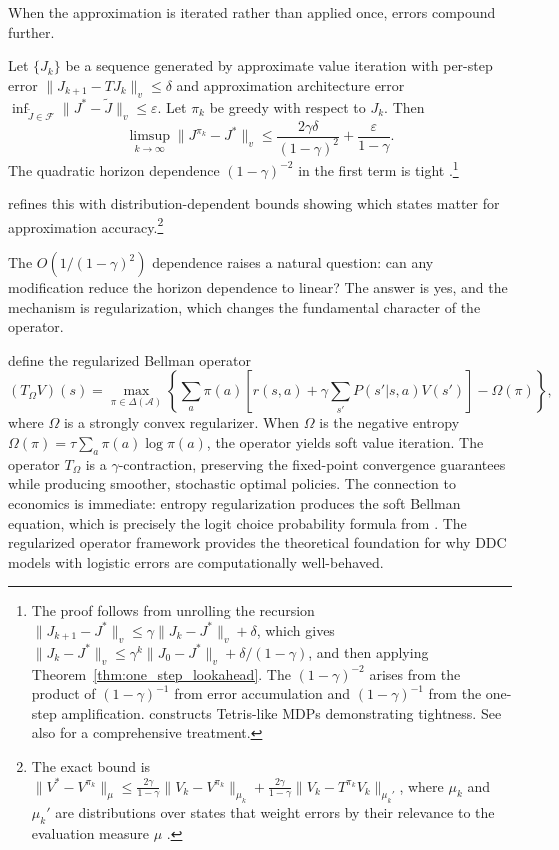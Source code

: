 When the approximation is iterated rather than applied once, errors compound further.

\begin{theorem}
\label{thm:avi_error}
Let $\{J_k\}$ be a sequence generated by approximate value iteration with per-step error $\|J_{k+1} - TJ_k\|_v \leq \delta$ and approximation architecture error $\inf_{\tilde{J} \in \mathcal{F}} \|J^* - \tilde{J}\|_v \leq \varepsilon$. Let $\pi_k$ be greedy with respect to $J_k$. Then
\[
\limsup_{k \to \infty} \|J^{\pi_k} - J^*\|_v \leq \frac{2\gamma\delta}{(1-\gamma)^2} + \frac{\varepsilon}{1-\gamma}.
\]
The quadratic horizon dependence $(1-\gamma)^{-2}$ in the first term is tight \citep{scherrer2015}.\footnote{The proof follows from unrolling the recursion $\|J_{k+1} - J^*\|_v \leq \gamma \|J_k - J^*\|_v + \delta$, which gives $\|J_k - J^*\|_v \leq \gamma^k \|J_0 - J^*\|_v + \delta/(1-\gamma)$, and then applying Theorem~\ref{thm:one_step_lookahead}. The $(1-\gamma)^{-2}$ arises from the product of $(1-\gamma)^{-1}$ from error accumulation and $(1-\gamma)^{-1}$ from the one-step amplification. \citet{scherrer2015} constructs Tetris-like MDPs demonstrating tightness. See also \citet{farahmand2010} for a comprehensive treatment.}
\end{theorem}

\citet{munos2003} refines this with distribution-dependent bounds showing which states matter for approximation accuracy.\footnote{The exact bound is $\|V^* - V^{\pi_k}\|_\mu \leq \frac{2\gamma}{1-\gamma}\|V_k - V^{\pi_k}\|_{\mu_k} + \frac{2\gamma}{1-\gamma}\|V_k - T^{\pi_k}V_k\|_{\mu_k'}$, where $\mu_k$ and $\mu_k'$ are distributions over states that weight errors by their relevance to the evaluation measure $\mu$ \citep{munos2003}.}

The $O(1/(1-\gamma)^2)$ dependence raises a natural question: can any modification reduce the horizon dependence to linear? The answer is yes, and the mechanism is regularization, which changes the fundamental character of the operator.

\citet{geist2019regularized} define the regularized Bellman operator
\begin{equation}
(T_\Omega V)(s) = \max_{\pi \in \Delta(\mathcal{A})} \left\{ \sum_a \pi(a) \left[ r(s,a) + \gamma \sum_{s'} P(s'|s,a) V(s') \right] - \Omega(\pi) \right\},
\end{equation}
where $\Omega$ is a strongly convex regularizer. When $\Omega$ is the negative entropy $\Omega(\pi) = \tau \sum_a \pi(a) \log \pi(a)$, the operator yields soft value iteration. The operator $T_\Omega$ is a $\gamma$-contraction, preserving the fixed-point convergence guarantees while producing smoother, stochastic optimal policies. The connection to economics is immediate: entropy regularization produces the soft Bellman equation, which is precisely the logit choice probability formula from \citet{Rust1987}. The regularized operator framework provides the theoretical foundation for why DDC models with logistic errors are computationally well-behaved.

